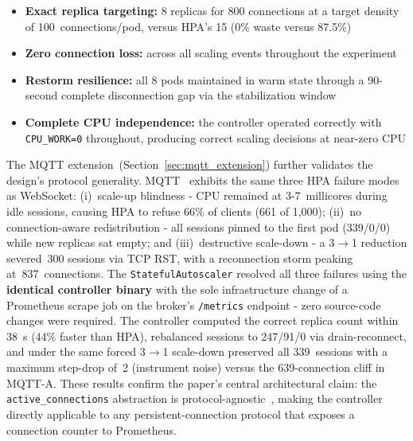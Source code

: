 \documentclass[twocolumn]{svjour3}
\begin{document}
\begin{itemize}[leftmargin=*]
\item \textbf{Exact replica targeting:} 8 replicas for 800 connections at a target density of 100~connections/pod, versus HPA's 15 (0\% waste versus 87.5\%)
\item \textbf{Zero connection loss:} across all scaling events throughout the experiment
\item \textbf{Restorm resilience:} all 8 pods maintained in warm state through a 90-second complete disconnection gap via the stabilization window
\item \textbf{Complete CPU independence:} the controller operated correctly with \texttt{CPU\_WORK=0} throughout, producing correct scaling decisions at near-zero CPU
\end{itemize}

The MQTT extension~(Section~\ref{sec:mqtt_extension}) further validates the design's protocol generality. MQTT~\cite{mqtt_v31} exhibits the same three HPA failure modes as WebSocket: (i)~scale-up blindness - CPU remained at 3-7~millicores during idle sessions, causing HPA to refuse 66\% of clients (661 of 1{,}000); (ii)~no connection-aware redistribution - all sessions pinned to the first pod (339/0/0) while new replicas sat empty; and (iii)~destructive scale-down - a 3$\rightarrow$1 reduction severed~300 sessions via TCP RST, with a reconnection storm peaking at~837~connections. The \texttt{StatefulAutoscaler} resolved all three failures using the \textbf{identical controller binary} with the sole infrastructure change of a Prometheus scrape job on the broker's \texttt{/metrics} endpoint - zero source-code changes were required. The controller computed the correct replica count within 38~s (44\% faster than HPA), rebalanced sessions to 247/91/0 via drain-reconnect, and under the same forced 3$\rightarrow$1 scale-down preserved all 339~sessions with a maximum step-drop of~2 (instrument noise) versus the 639-connection cliff in MQTT-A. These results confirm the paper's central architectural claim: the \texttt{active\_connections} abstraction is protocol-agnostic~\cite{soni2017mqtt}, making the controller directly applicable to any persistent-connection protocol that exposes a connection counter to Prometheus.
\end{document}
